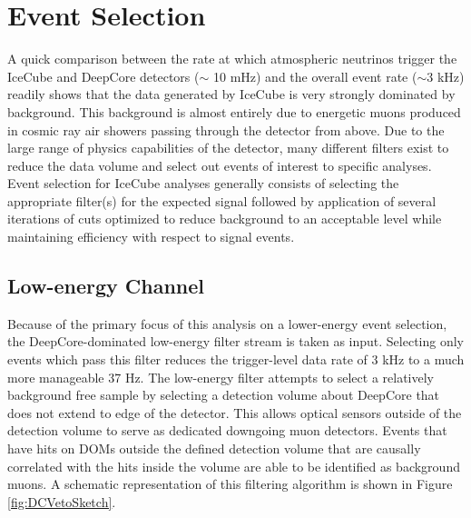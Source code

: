 \documentclass{gatech-thesis}
\begin{document}
\chapter{Event Selection}
A quick comparison between the rate at which atmospheric neutrinos trigger the IceCube and DeepCore detectors ($\sim$ 10 mHz) and the overall event rate ($\sim 3$ kHz) readily shows that the data generated by IceCube is very strongly dominated by background. This background is almost entirely due to energetic muons produced in cosmic ray air showers passing through the detector from above. Due to the large range of physics capabilities of the detector, many different filters exist to reduce the data volume and select out events of interest to specific analyses. Event selection for IceCube analyses generally consists of selecting the appropriate filter(s) for the expected signal followed by application of several iterations of cuts optimized to reduce background to an acceptable level while maintaining efficiency with respect to signal events.


\section{Low-energy Channel}

Because of the primary focus of this analysis on a lower-energy event selection, the DeepCore-dominated low-energy filter stream is taken as input. Selecting only events which pass this filter reduces the trigger-level data rate of 3 kHz to a much more manageable 37 Hz. The low-energy filter attempts to select a relatively background free sample by selecting a detection volume about DeepCore that does not extend to edge of the detector. This allows optical sensors outside of the detection volume to serve as dedicated downgoing muon detectors. Events that have hits on DOMs outside the defined detection volume that are causally correlated with the hits inside the volume are able to be identified as background muons. A schematic representation of this filtering algorithm is shown in Figure \ref{fig:DCVetoSketch}. 
\end{document}
